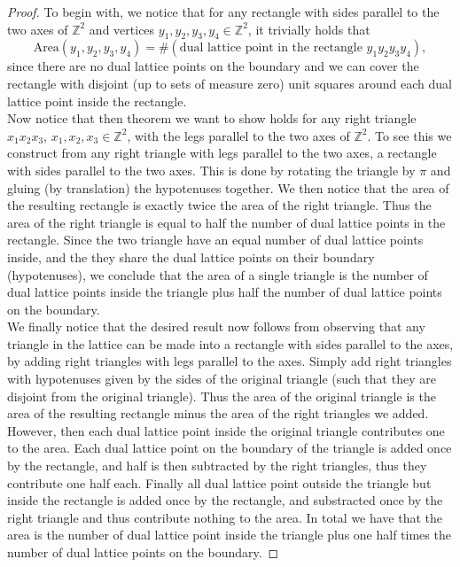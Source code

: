 \documentclass[a4paper,11pt]{article}
\newcommand{\Z}{\mathbb{Z}}
\newcommand{\Area}{\text{Area}}
\numberwithin{equation}{section}
\begin{document}
\begin{proof}
	To begin with, we notice that for any rectangle with sides parallel to the two axes of $ \Z^2 $ and vertices $ y_1,y_2,y_3,y_4\in \Z^2 $, it trivially holds that \begin{equation}
	\Area(y_1,y_2,y_3,y_4)=\#(\text{dual lattice point in the rectangle }y_1y_2y_3y_4),
	\end{equation}
	since there are no dual lattice points on the boundary and we can cover the rectangle with disjoint (up to sets of measure zero) unit squares around each dual lattice point inside the rectangle.\\
	Now notice that then theorem we want to show holds for any right triangle $ x_1x_2x_3 $, $ x_1,x_2,x_3\in\Z^2 $,  with the legs parallel to the two axes of $ \Z^2 $. To see this we construct from any right triangle with legs parallel to the two axes, a rectangle with sides parallel to the two axes. This is done by rotating the triangle by $ \pi $ and gluing (by translation) the hypotenuses together. We then notice that the area of the resulting rectangle is exactly twice the area of the right triangle. Thus the area of the right triangle is equal to half the number of dual lattice points in the rectangle. Since the two triangle have an equal number of dual lattice points inside, and the they share the dual lattice points on their boundary (hypotenuses), we conclude that the area of a single triangle is the number of dual lattice points inside the triangle plus half the number of dual lattice points on the boundary.\\
	We finally notice that the desired result now follows from observing that any triangle in the lattice can be made into a rectangle with sides parallel to the axes, by adding right triangles with legs parallel to the axes. Simply add right triangles with hypotenuses given by the sides of the original triangle (such that they are disjoint from the original triangle). Thus the area of the original triangle is the area of the resulting rectangle minus the area of the right triangles we added. However, then each dual lattice point inside the original triangle contributes one to the area. Each dual lattice point on the boundary of the triangle is added once by the rectangle, and half is then subtracted by the right triangles, thus they contribute one half each. Finally all dual lattice point outside the triangle but inside the rectangle is added once by the rectangle, and substracted once by the right triangle and thus contribute nothing to the area. In total we have that the area is the number of dual lattice point inside the triangle plus one half times the number of dual lattice points on the boundary. 
\end{proof}
\end{document}
